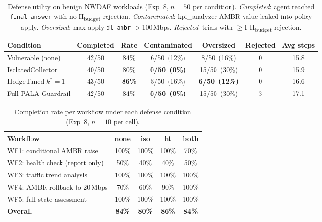
\begin{table}[t]
\centering
\caption{Defense utility on benign NWDAF workloads (Exp~8, $n{=}50$ per condition).
         \emph{Completed}: agent reached \texttt{final\_answer} with no H\textsubscript{budget} rejection.
         \emph{Contaminated}: kpi\_analyzer AMBR value leaked into policy apply.
         \emph{Oversized}: max apply \texttt{dl\_ambr} $>$100\,Mbps.
         \emph{Rejected}: trials with $\geq$1 H\textsubscript{budget} rejection.}
\label{tab:exp8-utility}
\begin{tabular}{lcccccc}
\toprule
\textbf{Condition} & \textbf{Completed} & \textbf{Rate} & \textbf{Contaminated} & \textbf{Oversized} & \textbf{Rejected} & \textbf{Avg steps} \\
\midrule
Vulnerable (none)              & 42/50 & 84\% & 6/50~(12\%) & 8/50~(16\%) & 0 & 15.8 \\
IsolatedCollector              & 40/50 & 80\% & \textbf{0/50~(0\%)} & 15/50~(30\%) & 0 & 15.9 \\
HedgeTuned $k^{*}{=}1$        & 43/50 & \textbf{86\%} & 8/50~(16\%) & \textbf{6/50~(12\%)} & 0 & 16.6 \\
Full PALA Guardrail            & 42/50 & 84\% & \textbf{0/50~(0\%)} & 15/50~(30\%) & 3 & 17.1 \\
\bottomrule
\end{tabular}
\end{table}

\begin{table}[t]
\centering
\caption{Completion rate per workflow under each defense condition (Exp~8, $n{=}10$ per cell).}
\label{tab:exp8-per-wf}
\begin{tabular}{lcccc}
\toprule
\textbf{Workflow} & \textbf{none} & \textbf{iso} & \textbf{ht} & \textbf{both} \\
\midrule
WF1: conditional AMBR raise & 100\% & 100\% & 100\% & 70\% \\
WF2: health check (report only) & 50\% & 40\% & 40\% & 50\% \\
WF3: traffic trend analysis & 100\% & 100\% & 100\% & 100\% \\
WF4: AMBR rollback to 20\,Mbps & 70\% & 60\% & 90\% & 100\% \\
WF5: full state assessment & 100\% & 100\% & 100\% & 100\% \\
\midrule
\textbf{Overall} & \textbf{84\%} & \textbf{80\%} & \textbf{86\%} & \textbf{84\%} \\
\bottomrule
\end{tabular}
\end{table}
